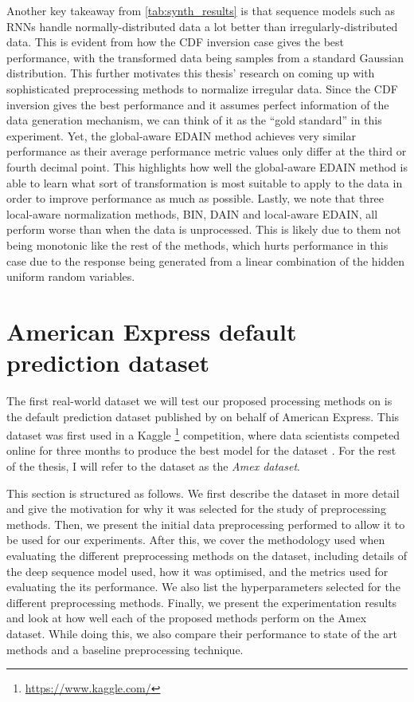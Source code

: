 \documentclass{statsmsc}
\begin{document}
{Another key takeaway from \cref{tab:synth_results} is that sequence
models such as \acp{RNN} handle normally-distributed data a lot better than irregularly-distributed
data. This is evident from how the \ac{CDF} inversion case gives the best performance, with the
transformed data being samples from a standard Gaussian distribution. This further motivates this
thesis' research on coming up with sophisticated preprocessing methods to normalize irregular data.
Since the \ac{CDF} inversion gives the best performance and it assumes perfect information of the
data generation mechanism, we can think of it as the ``gold standard'' in this experiment.
Yet, the global-aware \ac{EDAIN} method achieves very similar performance as their
average performance metric values only differ at the third or fourth decimal point. This highlights
how well the global-aware \ac{EDAIN} method is able to learn what sort of transformation
is most suitable to apply to the data in order to improve performance as much as possible.
Lastly, we note that three local-aware normalization methods, \ac{BIN},
\ac{DAIN} and local-aware \ac{EDAIN}, all perform worse than when the data is unprocessed.
This is likely due to them not being monotonic like the rest of the methods,
which hurts performance in this case due to the response being generated from a
linear combination of the hidden uniform random variables.


\section{American Express default prediction dataset}%
\label{sec:amex_data}%

The first real-world dataset we will test our proposed processing methods on is
the default prediction dataset published by \cite{amex-data} on behalf of
American Express.  This dataset was first used in a Kaggle%
\footnote{\url{https://www.kaggle.com/}} competition, where data scientists
competed online for three months to produce the best model for the dataset
\citep{amex-data}.  For the rest of the thesis, I will refer to the dataset as
the \textit{Amex dataset}.

This section is structured as follows. We first describe the
dataset in more detail and give the motivation for why it was selected for the study of
preprocessing methods. Then, we present the initial data preprocessing performed to allow it to
be used for our experiments. After this, we
cover the  methodology used when evaluating the different preprocessing methods on
the dataset, including details of the deep sequence model used, how it was optimised, and
the metrics used for evaluating the its performance.
We also list the hyperparameters selected for the different preprocessing methods.
Finally, we present the experimentation results and look at how well each of the proposed methods
perform on the Amex dataset. While doing this, we also compare their performance to state of
the art methods and a baseline preprocessing technique.

}
\end{document}
